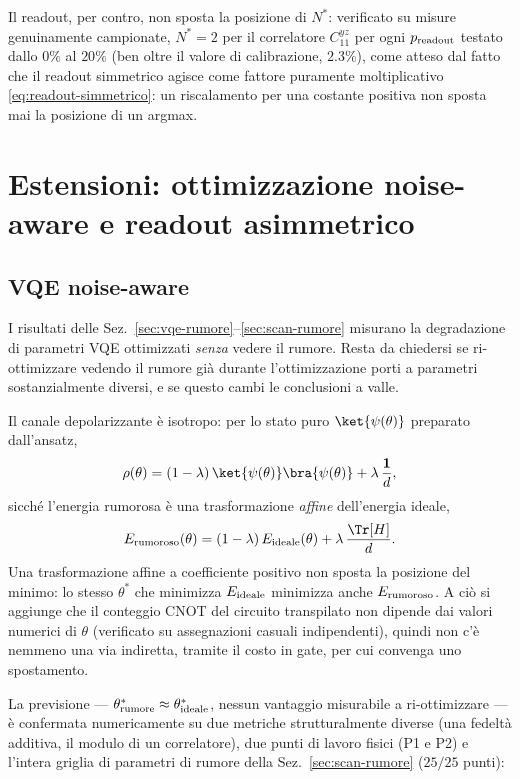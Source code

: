 \documentclass[11pt,a4paper]{article}
\begin{document}
Il readout, per contro, non sposta la posizione di $N^*$: verificato su
misure genuinamente campionate, $N^*=2$ per il correlatore $C_{11}^{yz}$
per ogni $p_{\rm readout}$ testato dallo $0\%$ al $20\%$ (ben oltre il
valore di calibrazione, $2.3\%$), come atteso dal fatto che il readout
simmetrico agisce come fattore puramente moltiplicativo
\eqref{eq:readout-simmetrico}: un riscalamento per una costante positiva
non sposta mai la posizione di un argmax.

\section{Estensioni: ottimizzazione noise-aware e readout asimmetrico}
\label{sec:estensioni}

\subsection{VQE noise-aware}
\label{sec:noise-aware}

I risultati delle Sez.~\ref{sec:vqe-rumore}--\ref{sec:scan-rumore}
misurano la degradazione di parametri VQE ottimizzati \emph{senza} vedere
il rumore. Resta da chiedersi se ri-ottimizzare vedendo il rumore già
durante l'ottimizzazione porti a parametri sostanzialmente diversi, e se
questo cambi le conclusioni a valle.

Il canale depolarizzante è isotropo: per lo stato puro
$\ket{\psi(\theta)}$ preparato dall'ansatz,
\begin{equation}
\rho(\theta) = (1-\lambda)\,\ket{\psi(\theta)}\bra{\psi(\theta)} + \lambda\,\frac{\mathbf 1}{d},
\end{equation}
sicché l'energia rumorosa è una trasformazione \emph{affine}
dell'energia ideale,
\begin{equation}
E_{\rm rumoroso}(\theta) = (1-\lambda)\,E_{\rm ideale}(\theta) + \lambda\,\frac{\Tr[H]}{d}.
\label{eq:affine-energia}
\end{equation}
Una trasformazione affine a coefficiente positivo non sposta la posizione
del minimo: lo stesso $\theta^*$ che minimizza $E_{\rm ideale}$ minimizza
anche $E_{\rm rumoroso}$. A ciò si aggiunge che il conteggio CNOT del
circuito transpilato non dipende dai valori numerici di $\theta$
(verificato su assegnazioni casuali indipendenti), quindi non c'è nemmeno
una via indiretta, tramite il costo in gate, per cui convenga uno
spostamento.

La previsione --- $\theta^*_{\rm rumore}\approx\theta^*_{\rm ideale}$,
nessun vantaggio misurabile a ri-ottimizzare --- è confermata numericamente
su due metriche strutturalmente diverse (una fedeltà additiva, il modulo
di un correlatore), due punti di lavoro fisici (P1 e P2) e l'intera
griglia di parametri di rumore della Sez.~\ref{sec:scan-rumore}
($25/25$ punti):
\end{document}
